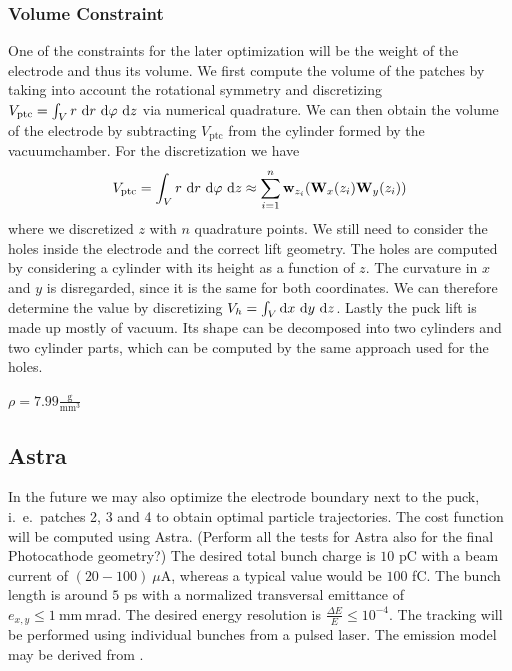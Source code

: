 \subsubsection{Volume Constraint}
One of the constraints for the later optimization will be the weight of the electrode and thus its volume.
We first compute the volume of the patches by taking into account the rotational symmetry and discretizing $V_{\mathrm{ptc}} = \int_V r\ \mathrm{d} r\ \mathrm{d} \varphi\ \mathrm{d} z$ via numerical quadrature. We can then obtain the volume of the electrode by subtracting $V_{\mathrm{ptc}}$ from the cylinder formed by the vacuumchamber.
For the discretization we have
\begin{align}
   V_{\mathrm{ptc}} = \int_V r\ \mathrm{d} r\ \mathrm{d} \varphi\ \mathrm{d} z \approx \sum_{i=1}^n \mathbf{w}_{z_i} (\mathbf{W}_x(z_i) \mathbf{W}_y(z_i))
\end{align}
where we discretized $z$ with $n$ quadrature points. 
We still need to consider the holes inside the electrode and the correct lift geometry. The holes are computed by considering a cylinder with its height as a function of $z$. The curvature in $x$ and $y$ is disregarded, since it is the same for both coordinates. We can therefore determine the value by discretizing $V_{h} = \int_V \mathrm{d} x\ \mathrm{d} y\ \mathrm{d} z$.
Lastly the puck lift is made up mostly of vacuum. Its shape can be decomposed into two cylinders and two cylinder parts, which can be computed by the same approach used for the holes.

$\rho = 7.99 \frac{\mathrm{g}}{\mathrm{mm}^3}$

\subsection{Astra}
In the future we may also optimize the electrode boundary next to the puck, i.~e.~patches 2, 3 and 4 to obtain optimal particle trajectories. The cost function will be computed using Astra. (Perform all the tests for Astra also for the final Photocathode geometry?)
The desired total bunch charge is $10$ pC with a beam current of $(20-100)\ \mu\mathrm{A}$, whereas a typical value would be $100$ fC. The bunch length is around $5$ ps with a normalized transversal emittance of $e_{x,y} \leq 1\ \mathrm{mm\ mrad}$. The desired energy resolution is $\frac{\Delta E}{E} \leq 10^{-4}$.
The tracking will be performed using individual bunches from a pulsed laser. The emission model may be derived from \cite{wagner}.
